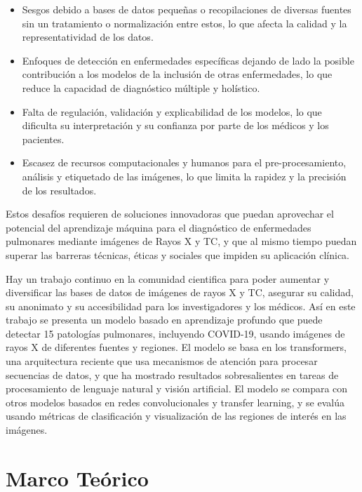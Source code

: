 \begin{itemize}
    \item Sesgos debido a bases de datos pequeñas o recopilaciones de diversas fuentes sin un
          tratamiento o normalización entre estos, lo que afecta la calidad y la representatividad
          de los datos.
    \item Enfoques de detección en enfermedades específicas dejando de lado la posible contribución
          a los modelos de la inclusión de otras enfermedades, lo que reduce la capacidad de
          diagnóstico múltiple y holístico.
    \item Falta de regulación, validación y explicabilidad de los modelos, lo que dificulta su
          interpretación y su confianza por parte de los médicos y los pacientes.
    \item Escasez de recursos computacionales y humanos para el pre-procesamiento, análisis y
          etiquetado de las imágenes, lo que limita la rapidez y la precisión de los resultados.
\end{itemize}

Estos desafíos requieren de soluciones innovadoras que puedan aprovechar el potencial del aprendizaje
máquina para el diagnóstico de enfermedades pulmonares mediante imágenes de Rayos X y TC, y que al
mismo tiempo puedan superar las barreras técnicas, éticas y sociales que impiden su aplicación clínica.

Hay un trabajo continuo en la comunidad cientifica para poder aumentar y diversificar las bases de
datos de imágenes de rayos X y TC, asegurar su calidad, su anonimato y su accesibilidad para los
investigadores y los médicos. Así en este trabajo se presenta un modelo basado en aprendizaje profundo
que puede detectar 15 patologías
pulmonares, incluyendo COVID-19, usando imágenes de rayos X de diferentes fuentes y regiones.
El modelo se basa en los transformers, una arquitectura reciente que usa mecanismos de atención para
procesar secuencias de datos, y que ha mostrado resultados sobresalientes en tareas de procesamiento
de lenguaje natural y visión artificial. El modelo se compara con otros modelos basados en redes
convolucionales y transfer learning, y se evalúa usando métricas de clasificación y visualización
de las regiones de interés en las imágenes.


\chapter{Marco Teórico}

